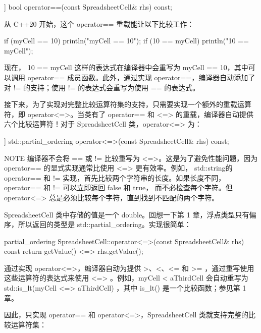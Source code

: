 \begin{cpp}
[[nodiscard]] bool operator==(const SpreadsheetCell& rhs) const;
\end{cpp}

从 C++20 开始，这个 operator== 重载能让以下比较工作：

\begin{cpp}
if (myCell == 10) { println("myCell == 10"); }
if (10 == myCell) { println("10 == myCell"); }
\end{cpp}

现在， 10 == myCell 这样的表达式在编译器中会重写为 myCell == 10，其中可以调用 operator== 成员函数。此外，通过实现 operator==，编译器自动添加了对 != 的支持；使用 != 的表达式会重写为使用 == 的表达式。

接下来，为了实现对完整比较运算符集的支持，只需要实现一个额外的重载运算符，即 operator<=>。当类有了 operator== 和 <=> 的重载，编译器自动提供六个比较运算符！对于 SpreadsheetCell 类，operator<=> 为：

\begin{cpp}
[[nodiscard]] std::partial_ordering operator<=>(const SpreadsheetCell& rhs) const;
\end{cpp}

\begin{myNotic}{NOTE}
编译器不会将 == 或 != 比较重写为 <=>。这是为了避免性能问题，因为 operator== 的显式实现通常比使用 <=> 更有效率。例如， std::string的 operator== 和 != 实现，首先比较两个字符串的长度。如果长度不同，operator== 和 != 可以立即返回 false 和 true， 而不必检查每个字符。但operator<=> 总是必须比较每个字符，直到找到不匹配的两个字符。
\end{myNotic}

SpreadsheetCell 类中存储的值是一个 double。回想一下第 1 章，浮点类型只有偏序，所以返回的类型是 std::partial\_ordering。实现很简单：

\begin{cpp}
partial_ordering SpreadsheetCell::operator<=>(const SpreadsheetCell& rhs) const
{
    return getValue() <=> rhs.getValue();
}
\end{cpp}

通过实现 operator<=>，编译器自动为提供 >、<、<= 和 >= ，通过重写使用这些运算符的表达式来使用 <=> 。例如，myCell < aThirdCell 会自动重写为 std::is\_lt(myCell <=> aThirdCell) ，其中 is\_lt() 是一个比较函数；参见第 1 章。

因此，只实现 operator== 和 operator<=>，SpreadsheetCell 类就支持完整的比较运算符集：

